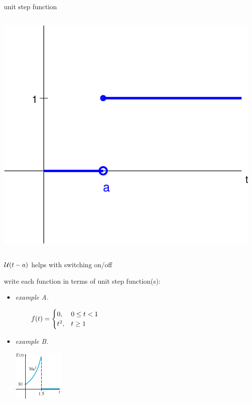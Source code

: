 \documentclass[urlcolor=blue,dvipsnames]{beamer}
\begin{document}
\begin{frame}{unit step function}
\begin{columns}
\begin{column}{0.35\textwidth}
\vspace{4mm}
\includegraphics[width=\textwidth]{figs/unitsteptrans}
\end{column}
\end{columns}
\end{frame}


\begin{frame}{$\mathcal{U}(t-a)$ helps with switching on/off}

\small
write each function in terms of unit step function(s):
\begin{itemize}
\item \emph{example A.} %

\vspace{-3mm}
    $$f(t) = \begin{cases} 0, & 0 \le t < 1 \\ t^2, & t\ge 1 \end{cases} \hspace{70mm}$$

\vspace{6mm}
\item \emph{example B.} %

\includegraphics[width=25mm]{figs/Egoesoff}

\vspace{6mm}
\end{itemize}
\end{frame}
\end{document}
